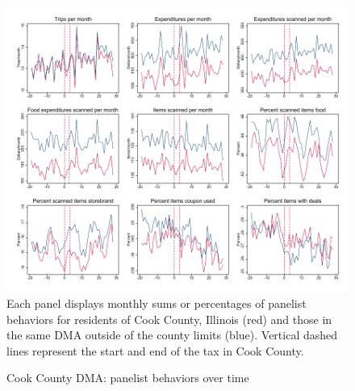 \documentclass[12pt]{article}
\begin{document}
\clearpage
\begin{figure}[t]
\begin{center}
\caption{Cook County DMA: panelist behaviors over time}
\label{cook_panelist_behav}
\includegraphics[width=1\textwidth, angle=0]{../figures/panelist_behav.pdf}
\footnotesize Each panel displays monthly sums or percentages of panelist behaviors for residents of Cook County, Illinois (red) and those in the same DMA outside of the county limits (blue). Vertical dashed lines represent the start and end of the tax in Cook County.
\end{center}
\end{figure}
\end{document}
